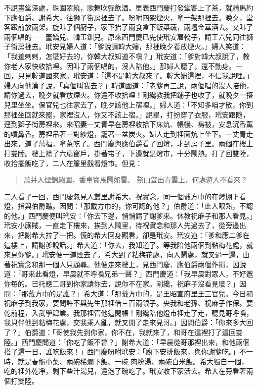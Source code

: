 不說畫堂深處，珠圍翠繞，歌舞吹彈飲酒。單表西門慶打發堂客上了茶，就騎馬約下應伯爵、謝希大，往獅子街房裡去了。吩咐四架煙火，拿一架那裡去。晚夕，堂客跟前放兩架。旋叫了個廚子，家下抬了兩食盒下飯菜蔬，兩壇金華酒去。又叫了兩個唱的——董嬌兒、韓玉釧兒。原來西門慶已先使玳安雇轎子，請王六兒同往獅子街房裡去。玳安見婦人道：「爹說請韓大嬸，那裡晚夕看放煙火。」婦人笑道：「我羞剌剌，怎麼好去的，你韓大叔知道不嗔？」玳安道：「爹對韓大叔說了，教你老人家快收拾哩。因叫了兩個唱的，沒人陪他。」那婦人聽了，還不動身。一回，只見韓道國來家。玳安道：「這不是韓大叔來了。韓大嬸這裡，不信我說哩。」婦人向他漢子說，「真個叫我去？」韓道國道：「老爹再三說，兩個唱的沒人陪他，請你過去，晚夕就看放煙火。你還不收拾哩！剛纔教我把鋪子也收了，就晚夕一搭兒里坐坐。保官兒也往家去了，晚夕該他上宿哩。」婦人道：「不知多咱才散，你到那裡坐回就來罷，家裡沒人，你又不該上宿。」說畢，打扮穿了衣服，玳安跟隨，逕到獅子街房裡來。來昭妻一丈青早在房裡收拾下床炕、帳幔、褥被，安息沉香薰的噴鼻香。房裡吊著一對紗燈，籠著一盆炭火。婦人走到裡面炕上坐下。一丈青走出來，道了萬福，拿茶吃了。西門慶與應伯爵看了回燈，才到房子里。兩個在樓上打雙陸。樓上除了六扇窗戶，掛著帘子，下邊就是燈市，十分鬧熱。打了回雙陸，收拾擺飯吃了，二人在簾里觀看燈市。但見：
\begin{quote}
萬井人煙錦繡圍，香車寶馬鬧如雷。
鰲山聳出青雲上，何處遊人不看來？
\end{quote}

二人看了一回，西門慶忽見人叢里謝希大、祝實念，同一個戴方巾的在燈棚下看燈，指與伯爵瞧。因問：「那戴方巾的，你可認的他？」伯爵道：「此人眼熟，不認的他。」西門慶便叫玳安：「你去下邊，悄悄請了謝爹來。休教祝麻子和那人看見。」玳安小廝賊，一直走下樓來，挨到人鬧里，待祝實念和那人先過去了，從旁邊出來，把謝希大拉了一把。慌的希大回身觀看，卻是玳安。玳安道：「爹和應二爹在這樓上，請謝爹說話。」希大道：「你去，我知道了。等我陪他兩個到粘梅花處，就來見你爹。」玳安便一道煙去了。希大到了粘梅花處，向人鬧處，就叉過一邊，由著祝實念和那一個人只顧尋。他便走來樓上，見西門慶、應伯爵兩個作揖，因說道：「哥來此看燈，早晨就不呼喚兄弟一聲？」西門慶道：「我早晨對眾人，不好邀你每的。已托應二哥到你家請你去，說你不在家。剛纔，祝麻子沒看見麼？」因問：「那戴方巾的是誰？」希大道：「那戴方巾的，是王昭宣府里王三官兒。今日和祝麻子到我家，要問許不與先生那裡借三百兩銀子。央我和老孫、祝麻子作保。要乾前程，入武學肄業。我那裡管他這閑帳！剛纔陪他燈市裡走了走，聽見哥呼喚，我只伴他到粘梅花處，交我乘人亂，就叉開了走來見哥。」因問伯爵：「你來多大回了？」伯爵道：「哥使我先到你家，你不在，我就來了，和哥在這裡打了這回雙陸。」西門慶問道：「你吃了飯不曾？」謝希大道：「早晨從哥那裡出來，和他兩個搭了這一日，誰吃飯來！」西門慶吩咐玳安：「廚下安排飯來，與你謝爹吃。」不一時，就是春盤小菜、兩碗稀爛下飯、一碗𤆑肉粉湯、兩碗白米飯。希大獨自一個，吃的裡外乾凈，剩下些汁湯兒，還泡了碗吃了。玳安收下家活去。希大在旁看著兩個打雙陸。

